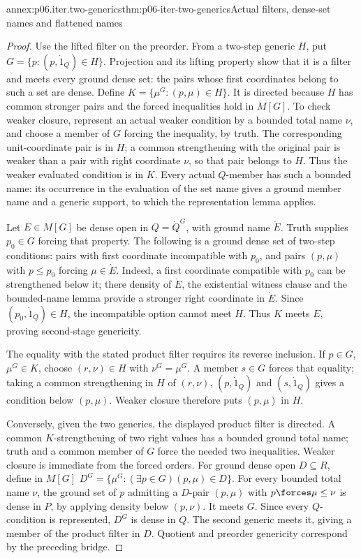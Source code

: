 \begin{annexitem}{annex:p06.iter.two-generics}{thm:p06-iter-two-generics}{Actual filters, dense-set names and flattened names}
\begin{proof}
Use the lifted filter on the preorder. From a two-step generic \(H\),
put \(G=\{p:(p,\dot1_Q)\in H\}\). Projection and its lifting property
show that it is a filter and meets every ground dense set: the pairs
whose first coordinates belong to such a set are dense. Define
\(K=\{\mu^G:(p,\mu)\in H\}\). It is directed because \(H\) has
common stronger pairs and the forced inequalities hold in \(M[G]\).
To check weaker closure, represent an actual weaker condition by a
bounded total name \(\nu\), and choose a member of \(G\) forcing
the inequality, by truth. The corresponding unit-coordinate pair is
in \(H\); a common strengthening with the original pair is weaker
than a pair with right coordinate \(\nu\), so that pair belongs to
\(H\). Thus the weaker evaluated condition is in \(K\).
Every actual \(Q\)-member has such a bounded name: its occurrence in
the evaluation of the set name gives a ground member name and a generic
support, to which the representation lemma applies.

Let \(E\in M[G]\) be dense open in \(Q=\dot Q^G\), with ground
name \(\dot E\). Truth supplies \(p_0\in G\) forcing that property.
The following is a ground dense set of two-step conditions: pairs with
first coordinate incompatible with \(p_0\), and pairs \((p,\mu)\)
with \(p\leq p_0\) forcing \(\mu\in\dot E\). Indeed, a first
coordinate compatible with \(p_0\) can be strengthened below it;
there density of \(\dot E\), the existential witness clause and the
bounded-name lemma provide a stronger right coordinate in \(\dot E\).
Since \((p_0,\dot1_Q)\in H\), the incompatible option cannot meet
\(H\). Thus \(K\) meets \(E\), proving second-stage genericity.

The equality with the stated product filter requires its reverse inclusion.
If \(p\in G\), \(\mu^G\in K\), choose \((r,\nu)\in H\) with
\(\nu^G=\mu^G\). A member \(s\in G\) forces that equality; taking
a common strengthening in \(H\) of \((r,\nu)\), \((p,\dot1_Q)\)
and \((s,\dot1_Q)\) gives a condition below \((p,\mu)\). Weaker
closure therefore puts \((p,\mu)\) in \(H\).

Conversely, given the two generics, the displayed product filter is
directed. A common \(K\)-strengthening of two right values has a bounded
ground total name; truth and a common member of \(G\) force the needed
two inequalities. Weaker closure is immediate from the forced orders.
For ground dense open \(D\subseteq R\), define in \(M[G]\)
\(D^G=\{\mu^G:(\exists p\in G)(p,\mu)\in D\}\).
For every bounded total name \(\nu\), the ground set of \(p\) admitting
a \(D\)-pair \((p,\mu)\) with \(p\forces\mu\leq\nu\) is dense
in \(P\), by applying density below \((p,\nu)\). It meets \(G\).
Since every \(Q\)-condition is represented, \(D^G\) is dense in
\(Q\). The second generic meets it, giving a member of the product
filter in \(D\). Quotient and preorder genericity correspond by the
preceding bridge.


\end{proof}
\end{annexitem}
